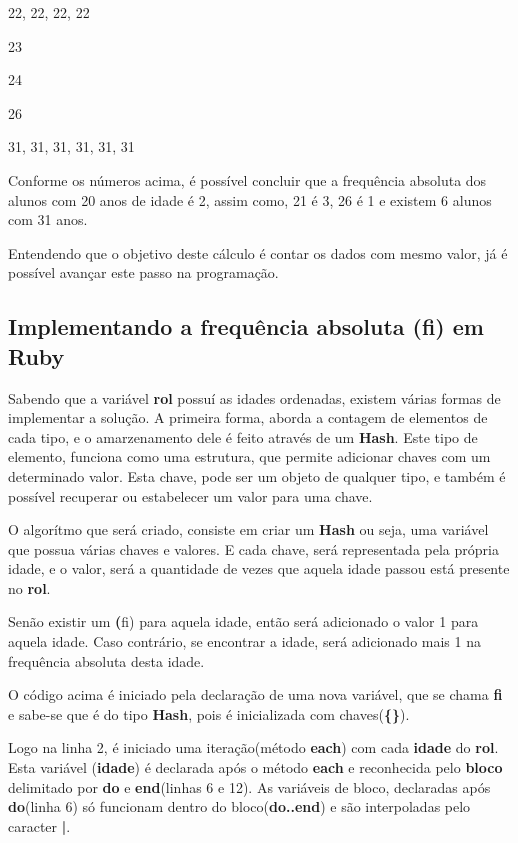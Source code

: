 \documentclass[espaco=simples,appendix=Name]{abnt}
\newcommand{\code}[1] {\textbf{#1}}
\begin{document}
22, 22, 22, 22

23

24

26

31, 31, 31, 31, 31, 31


Conforme os números acima, é possível concluir que a frequência absoluta dos alunos com 20 anos de idade é 2, assim como, 21 é 3, 26 é 1 e existem 6 alunos com 31 anos.

Entendendo que o objetivo deste cálculo é contar os dados com mesmo valor, já é possível avançar este passo na programação.

\subsection { Implementando a frequência absoluta (fi) em Ruby }

Sabendo que a variável \code{rol} possuí as idades ordenadas, existem várias formas de implementar a solução. A primeira forma, aborda a contagem de elementos de cada tipo, e o amarzenamento dele é feito através de um \code{Hash}. Este tipo de elemento, funciona como uma estrutura, que permite adicionar chaves com um determinado valor. Esta chave, pode ser um objeto de qualquer tipo, e também é possível recuperar ou estabelecer um valor para uma chave.

O algorítmo que será criado, consiste em criar um \code{Hash} ou seja, uma variável que possua várias chaves e valores. E cada chave, será representada pela própria idade, e o valor, será a quantidade de vezes que aquela idade passou está presente no \code{rol}. 

Senão existir um \code(fi) para aquela idade, então será adicionado o valor 1 para aquela idade.
Caso contrário, se encontrar a idade, será adicionado mais 1 na frequência absoluta desta idade.

 

O código acima é iniciado pela declaração de uma nova variável, que se chama \code{fi} e sabe-se que é do tipo \code{Hash}, pois é inicializada com chaves(\code{\{\}}). 

Logo na linha 2, é iniciado uma iteração(método \code{each}) com cada \code{idade} do \code{rol}. Esta variável (\code{idade}) é declarada após o método \code{each} e reconhecida pelo \textbf{bloco} delimitado por \code{do} e \code{end}(linhas 6 e 12). As variáveis de bloco, declaradas após \code{do}(linha 6) só funcionam dentro do bloco(\code{do..end}) e são interpoladas pelo caracter \code{|}.
\end{document}
